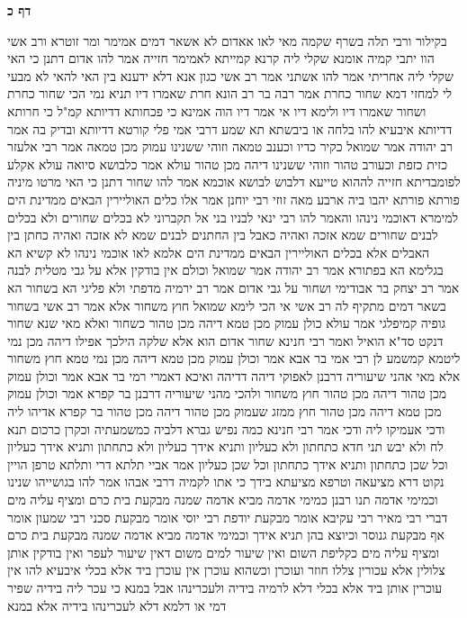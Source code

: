 \documentclass[12pt, openany]{book}
\newcommand{\sethebfont}{
\fontsize{10.5pt}{21.0pt} \selectfont
}
\newcommand{\twocol}[1]{
	{\sethebfont \begin{multicols}{2}
			#1
	\end{multicols}}	
}
\newcommand{\sectname}{}
\newcommand{\newsection}[1]{
	\addcontentsline{toc}{section}{#1}
	\renewcommand{\sectname}{#1}	
	\vspace{-\baselineskip}
	\begin{center}
		\textbf{%
\fontsize{16pt}{16pt}\selectfont
			#1}
	\end{center}
	\vspace{-\baselineskip}
	\nopagebreak
}
\begin{document}
\newsection{דף כ}
\twocol{בקילור ורבי תלה בשרף שקמה מאי לאו אאדום 
לא אשאר דמים 
אמימר ומר זוטרא ורב אשי הוו יתבי קמיה אומנא שקלי ליה קרנא קמייתא לאמימר חזייה אמר להו אדום דתנן כי האי שקלי ליה אחריתי אמר להו אשתני אמר רב אשי כגון אנא דלא ידענא בין האי להאי לא מבעי לי למחזי דמא
שחור כחרת אמר רבה בר רב הונא חרת שאמרו דיו תניא נמי הכי שחור כחרת ושחור שאמרו דיו ולימא דיו אי אמר דיו הוה אמינא כי פכחותא דדיותא קמ"ל כי חרותא דדיותא 
איבעיא להו בלחה או ביבשתא תא שמע דרבי אמי פלי קורטא דדיותא ובדיק בה 
אמר רב יהודה אמר שמואל כקיר כדיו וכענב טמאה וזוהי ששנינו עמוק מכן טמאה אמר רבי אלעזר כזית כזפת וכעורב טהור וזוהי ששנינו דיהה מכן טהור 
עולא אמר כלבושא סיואה עולא אקלע לפומבדיתא חזייה לההוא טייעא דלבוש לבושא אוכמא אמר להו שחור דתנן כי האי מרטו מיניה פורתא פורתא יהבו ביה ארבע מאה זוזי 
רבי יוחנן אמר אלו כלים האוליירין הבאים ממדינת הים למימרא דאוכמי נינהו והאמר להו רבי ינאי לבניו בני אל תקברוני לא בכלים שחורים ולא בכלים לבנים שחורים שמא אזכה ואהיה כאבל בין החתנים לבנים שמא לא אזכה ואהיה כחתן בין האבלים אלא בכלים האוליירין הבאים ממדינת הים 
אלמא לאו אוכמי נינהו לא קשיא הא בגלימא הא בפתורא 
אמר רב יהודה אמר שמואל וכולם אין בודקין אלא על גבי מטלית לבנה אמר רב יצחק בר אבודימי ושחור על גבי אדום 
אמר רב ירמיה מדפתי ולא פליגי הא בשחור הא בשאר דמים מתקיף לה רב אשי אי הכי לימא שמואל חוץ משחור אלא אמר רב אשי בשחור גופיה קמיפלגי 
אמר עולא כולן עמוק מכן טמא דיהה מכן טהור כשחור 
ואלא מאי שנא שחור דנקט סד"א הואיל ואמר רבי חנינא שחור אדום הוא אלא שלקה הילכך אפילו דיהה מכן נמי ליטמא קמשמע לן 
רבי אמי בר אבא אמר וכולן עמוק מכן טמא דיהה מכן נמי טמא חוץ משחור אלא מאי אהני שיעוריה דרבנן לאפוקי דיהה דדיהה 
ואיכא דאמרי רמי בר אבא אמר וכולן עמוק מכן טהור דיהה מכן טהור חוץ משחור ולהכי מהני שיעוריה דרבנן 
בר קפרא אמר וכולן עמוק מכן טמא דיהה מכן טהור חוץ ממזג שעמוק מכן טהור דיהה מכן טהור בר קפרא אדיהו ליה ודכי אעמיקו ליה ודכי אמר רבי חנינא כמה נפיש גברא דלביה כמשמעתיה
וכקרן כרכום תנא לח ולא יבש 
תני חדא כתחתון ולא כעליון ותניא אידך כעליון ולא כתחתון ותניא אידך כעליון וכל שכן כתחתון ותניא אידך כתחתון וכל שכן כעליון 
אמר אביי תלתא דרי ותלתא טרפן הויין
נקוט דרא מציעאה וטרפא מציעתא בידך 
כי אתו לקמיה דרבי אבהו אמר להו בגושייהו שנינו
וכמימי אדמה תנו רבנן כמימי אדמה מביא אדמה שמנה מבקעת בית כרם ומציף עליה מים דברי רבי מאיר רבי עקיבא אומר מבקעת יודפת רבי יוסי אומר מבקעת סכני רבי שמעון אומר אף מבקעת גנוסר וכיוצא בהן 
תניא אידך וכמימי אדמה מביא אדמה שמנה מבקעת בית כרם ומציף עליה מים כקליפת השום ואין שיעור למים משום דאין שיעור לעפר ואין בודקין אותן צלולין אלא עכורין צללו חוזר ועוכרן וכשהוא עוכרן אין עוכרן ביד אלא בכלי 
איבעיא להו אין עוכרין אותן ביד אלא בכלי דלא לרמיה בידיה ולעכרינהו אבל במנא כי עכר ליה בידיה שפיר דמי או דלמא דלא לעכרינהו בידיה אלא במנא 
}
\end{document}

